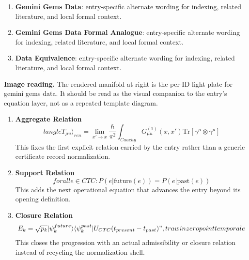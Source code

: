 \begin{enumerate}[leftmargin=1.6em,itemsep=6pt,topsep=4pt]
\item \textbf{Gemini Gems Data}: entry-specific alternate wording for indexing, related literature, and local formal context.
\item \textbf{Gemini Gems Data Formal Analogue}: entry-specific alternate wording for indexing, related literature, and local formal context.
\item \textbf{Data Equivalence}: entry-specific alternate wording for indexing, related literature, and local formal context.
\end{enumerate}

\begin{samepage}
\noindent\begin{minipage}[t]{0.45\linewidth}
\vspace{0pt}
\raggedright
\scriptsize\textbf{Image reading.} The rendered manifold at right is the per-ID light plate for gemini gems data. It should be read as the visual companion to the entry's equation layer, not as a repeated template diagram.\par
\end{minipage}\hfill
\begin{minipage}[t]{0.53\linewidth}
\vspace*{-0.10in}
\raggedright
{}
\end{minipage}
\end{samepage}

\clearpage


\begin{enumerate}[leftmargin=1.6em,itemsep=9pt,topsep=6pt]
\item \textbf{Aggregate Relation}
\[
langle T_{\mu u} \rangle_{ren} = \lim_{x' \to x} \frac{\hbar}{\pi^2} \int_{Cauchy} G_{\mu u}^{(1)}(x, x') \text{Tr}[\gamma^\mu \otimes \gamma^ u]
\]
This fixes the first explicit relation carried by the entry rather than a generic certificate record normalization.

\item \textbf{Support Relation}
\[
forall e \in CTC : P(e | \text{future}(e)) = P(e | \text{past}(e))
\]
This adds the next operational equation that advances the entry beyond its opening definition.

\item \textbf{Closure Relation}
\[
E_k = \sqrt{p_k} |\psi_k^{future}\rangle \langle \psi_k^{past}| U_{CTC}(t_{present} - t_{past})",trawin zero point temporal e
\]
This closes the progression with an actual admissibility or closure relation instead of recycling the normalization shell.
\end{enumerate}

